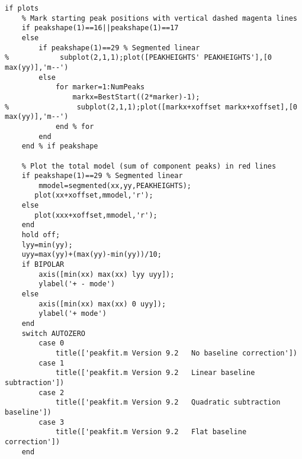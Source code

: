 \begin{lstlisting}
if plots
    % Mark starting peak positions with vertical dashed magenta lines
    if peakshape(1)==16||peakshape(1)==17
    else
        if peakshape(1)==29 % Segmented linear
%            subplot(2,1,1);plot([PEAKHEIGHTS' PEAKHEIGHTS'],[0 max(yy)],'m--')
        else
            for marker=1:NumPeaks
                markx=BestStart((2*marker)-1);
%                subplot(2,1,1);plot([markx+xoffset markx+xoffset],[0 max(yy)],'m--')
            end % for
        end
    end % if peakshape

    % Plot the total model (sum of component peaks) in red lines
    if peakshape(1)==29 % Segmented linear
        mmodel=segmented(xx,yy,PEAKHEIGHTS);
       plot(xx+xoffset,mmodel,'r');  
    else
       plot(xxx+xoffset,mmodel,'r');  
    end
    hold off;
    lyy=min(yy);
    uyy=max(yy)+(max(yy)-min(yy))/10;
    if BIPOLAR
        axis([min(xx) max(xx) lyy uyy]);
        ylabel('+ - mode')
    else
        axis([min(xx) max(xx) 0 uyy]);
        ylabel('+ mode')
    end
    switch AUTOZERO
        case 0
            title(['peakfit.m Version 9.2   No baseline correction'])
        case 1
            title(['peakfit.m Version 9.2   Linear baseline subtraction'])
        case 2
            title(['peakfit.m Version 9.2   Quadratic subtraction baseline'])
        case 3
            title(['peakfit.m Version 9.2   Flat baseline correction'])
    end
 

\end{lstlisting}
